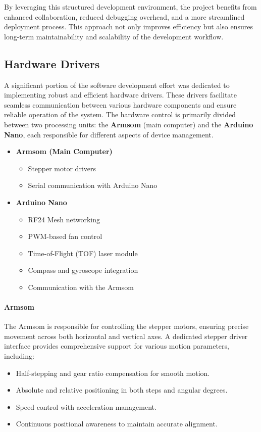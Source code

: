 By leveraging this structured development environment, the project benefits from enhanced collaboration, reduced debugging overhead, and a more streamlined deployment process. This approach not only improves efficiency but also ensures long-term maintainability and scalability of the development workflow.  

\subsection{Hardware Drivers}
A significant portion of the software development effort was dedicated to implementing robust and efficient hardware drivers. These drivers facilitate seamless communication between various hardware components and ensure reliable operation of the system. The hardware control is primarily divided between two processing units: the \textbf{Armsom} (main computer) and the \textbf{Arduino Nano}, each responsible for different aspects of device management.

\begin{itemize}
	\item \textbf{Armsom (Main Computer)}
	\begin{itemize}
		\item Stepper motor drivers
		\item Serial communication with Arduino Nano
	\end{itemize}
	\item \textbf{Arduino Nano}
	\begin{itemize}
		\item RF24 Mesh networking
		\item PWM-based fan control
		\item Time-of-Flight (TOF) laser module
		\item Compass and gyroscope integration
		\item Communication with the Armsom
	\end{itemize}
\end{itemize}

\paragraph{Armsom}
The Armsom is responsible for controlling the stepper motors, ensuring precise movement across both horizontal and vertical axes. A dedicated stepper driver interface provides comprehensive support for various motion parameters, including:
\begin{itemize}
	\item Half-stepping and gear ratio compensation for smooth motion.
	\item Absolute and relative positioning in both steps and angular degrees.
	\item Speed control with acceleration management.
	\item Continuous positional awareness to maintain accurate alignment.
\end{itemize}


